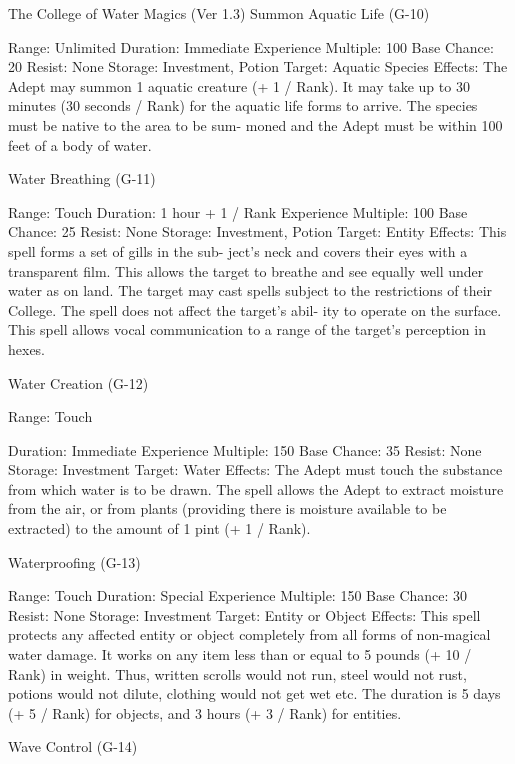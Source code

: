 \begin{Chapter}{The College of Water Magics (Ver 1.3)}
Summon Aquatic Life (G-10) 

Range: Unlimited 
Duration: Immediate 
Experience Multiple: 100 
Base Chance: 20%
Resist: None 
Storage: Investment, Potion 
Target: Aquatic Species 
Effects: The Adept may summon 1 aquatic creature 
(+  1  /  Rank).  It  may  take  up  to  30  minutes  (30 
seconds / Rank) for the aquatic life forms to arrive. 
The  species  must  be  native  to  the  area  to  be  sum-
moned and the Adept must be within 100 feet of a 
body of water. 

Water Breathing (G-11) 

Range: Touch 
Duration: 1 hour + 1 / Rank 
Experience Multiple: 100 
Base Chance: 25%
Resist: None 
Storage: Investment, Potion 
Target: Entity 
Effects:  This  spell  forms  a  set  of  gills  in  the  sub-
ject’s neck and covers their eyes with a transparent 
film.  This  allows  the  target  to  breathe  and  see 
equally  well  under  water  as  on  land.  The  target 
may  cast  spells  subject  to  the  restrictions  of  their 
College. The spell does not affect the target’s abil-
ity  to  operate  on  the  surface.  This  spell  allows 
vocal  communication  to  a  range  of  the  target’s 
perception in hexes. 

Water Creation (G-12) 

Range: Touch 

Duration: Immediate 
Experience Multiple: 150 
Base Chance: 35%
Resist: None 
Storage: Investment 
Target: Water 
Effects:  The  Adept  must  touch  the  substance  from 
which  water  is  to  be  drawn.  The  spell  allows  the 
Adept  to  extract  moisture  from  the  air,  or  from 
plants  (providing  there  is  moisture  available  to  be 
extracted) to the amount of 1 pint (+ 1 / Rank). 

Waterproofing (G-13) 

Range: Touch 
Duration: Special 
Experience Multiple: 150 
Base Chance: 30%
Resist: None 
Storage: Investment 
Target: Entity or Object 
Effects:  This  spell  protects  any  affected  entity  or 
object  completely  from  all  forms  of  non-magical 
water  damage.  It  works  on  any  item  less  than  or 
equal  to  5  pounds  (+  10  /  Rank)  in  weight.  Thus, 
written scrolls would not run, steel would not rust, 
potions  would  not  dilute,  clothing  would  not  get 
wet  etc.  The  duration  is  5  days  (+  5  /  Rank)  for 
objects, and 3 hours (+ 3 / Rank) for entities. 

Wave Control (G-14) 


\end{Chapter}
